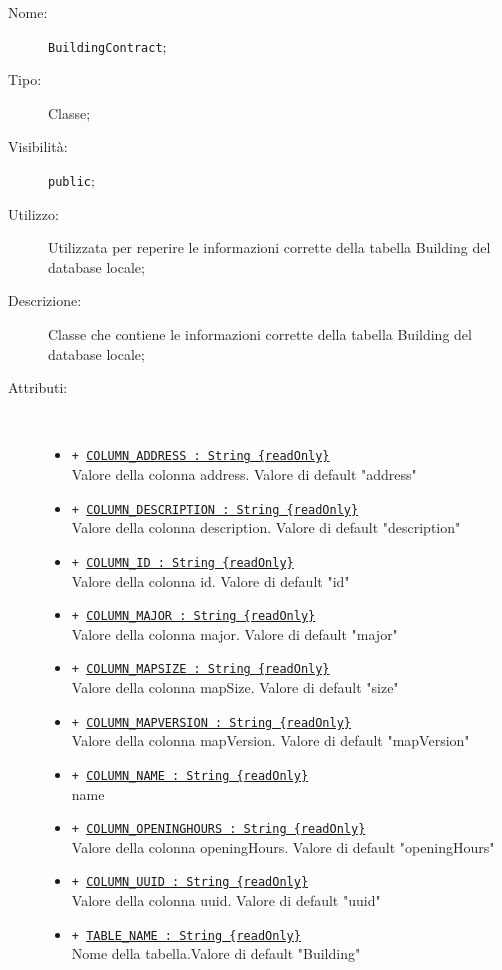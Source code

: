 \documentclass[../DefinizioneDiProdotto.tex]{subfiles}
\begin{document}
\begin{description}
	\item[Nome:] \texttt{BuildingContract};
	\item[Tipo:] Classe;
	\item[Visibilità:] \texttt{public};
	\item[Utilizzo:] Utilizzata per reperire le informazioni corrette della tabella Building del database locale;
	\item[Descrizione:] Classe che contiene le informazioni corrette della tabella Building del database locale;
	\item[Attributi:] \
	\begin{itemize}
		\item \texttt{+ \underline{COLUMN\_ADDRESS : String \{readOnly\}}}\\
		Valore della colonna address. Valore di default "address"
		
		\item \texttt{+ \underline{COLUMN\_DESCRIPTION : String \{readOnly\}}}\\
		Valore della colonna description. Valore di default "description"
		
		\item \texttt{+ \underline{COLUMN\_ID : String \{readOnly\}}}\\
		Valore della colonna id. Valore di default "id"
		
		\item \texttt{+ \underline{COLUMN\_MAJOR : String \{readOnly\}}}\\
		Valore della colonna major. Valore di default "major"
		
		\item \texttt{+ \underline{COLUMN\_MAPSIZE : String \{readOnly\}}}\\
		Valore della colonna mapSize. Valore di default "size"
		
		\item \texttt{+ \underline{COLUMN\_MAPVERSION : String \{readOnly\}}}\\
		Valore della colonna mapVersion. Valore di default "mapVersion"
		
		\item \texttt{+ \underline{COLUMN\_NAME : String \{readOnly\}}}\\
		name
		
		\item \texttt{+ \underline{COLUMN\_OPENINGHOURS : String \{readOnly\}}}\\
		Valore della colonna openingHours. Valore di default "openingHours"
		
		\item \texttt{+ \underline{COLUMN\_UUID : String \{readOnly\}}}\\
		Valore della colonna uuid. Valore di default "uuid"
		
		\item \texttt{+ \underline{TABLE\_NAME : String \{readOnly\}}}\\
		Nome della tabella.Valore di default "Building"
		
	\end{itemize}
\end{description}
\end{document}
